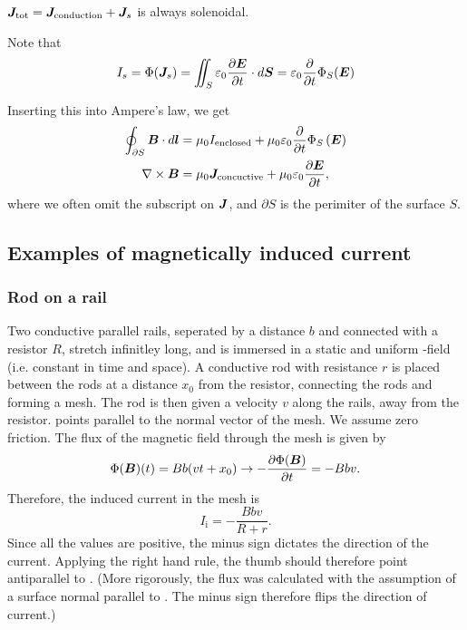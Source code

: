     $\bm{J}_{\text{tot}} = \bm{J}_{\text{conduction}} + \bm{J}_s$ is always solenoidal. 

    Note that 
    \begin{equation*}
        I_s = \Phi(\bm{J}_s) = \iint_S \varepsilon_0\frac{\partial\bm{E}}{\partial t}\cdot d\bm{S} = \varepsilon_0\frac{\partial}{\partial t}\Phi_S(\bm{E})
    \end{equation*}

    Inserting this into Ampere's law, we get 
    \begin{align}
        \oint_{\partial S}\bm{B}\cdot d\bm{l} &= \mu_0 I_{\text{enclosed}} + \mu_0\varepsilon_0\frac{\partial}{\partial t}\Phi_S\left(\bm{E}\right)\\
        \nabla\times\bm{B} &= \mu_0\bm{J}_{\text{concuctive}} + \mu_0\varepsilon_0\frac{\partial\bm{E}}{\partial t},
    \end{align}
    where we often omit the subscript on $\bm{J}$, and $\partial S$ is the perimiter of the surface $S$.

\subsection{Examples of magnetically induced current}
    \subsubsection*{Rod on a rail}
        Two conductive parallel rails, seperated by a distance $b$ and connected with a resistor $R$, stretch infinitley long, 
        and is immersed in a static and uniform \B-field (i.e. constant in time and space). 
        A conductive rod with resistance $r$ is placed between the rods at a distance $x_0$ from the resistor, 
        connecting the rods and forming a mesh. The rod is then given a velocity $v$ along the rails, away from the resistor.
        \B{} points parallel to the normal vector of the mesh. We assume zero friction. 
        The flux of the magnetic field through the mesh is given by
        \begin{equation}
            \Phi(\bm{B})(t) = Bb(vt+x_0) \rightarrow -\frac{\partial \Phi(\bm{B})}{\partial t} = -Bbv.
        \end{equation}
        Therefore, the induced current in the mesh is
        \begin{equation}
            I_\text{i} = -\frac{Bbv}{R+r}.
        \end{equation}
        Since all the values are positive, the minus sign dictates the direction of the current. Applying the right hand rule,
        the thumb should therefore point antiparallel to \B. 
        (More rigorously, the flux was calculated with the assumption of a surface normal parallel to \B. 
        The minus sign therefore flips the direction of current.)


